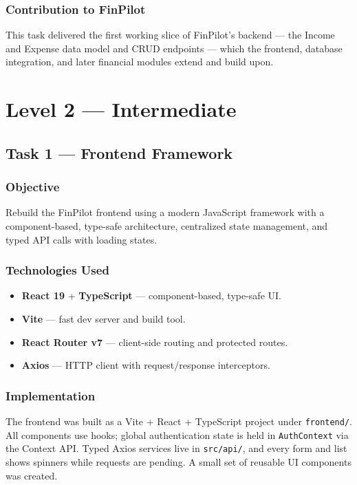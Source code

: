 \documentclass[11pt,a4paper]{report}
\begin{document}
\subsection{Contribution to FinPilot}
This task delivered the first working slice of FinPilot's backend --- the
Income and Expense data model and CRUD endpoints --- which the frontend, database
integration, and later financial modules extend and build upon.

\chapter{Level 2 --- Intermediate}

\section{Task 1 --- Frontend Framework}

\subsection{Objective}
Rebuild the FinPilot frontend using a modern JavaScript framework with a
component-based, type-safe architecture, centralized state management, and typed
API calls with loading states.

\subsection{Technologies Used}
\begin{itemize}[leftmargin=1.4em]
  \item \textbf{React 19} + \textbf{TypeScript} --- component-based, type-safe UI.
  \item \textbf{Vite} --- fast dev server and build tool.
  \item \textbf{React Router v7} --- client-side routing and protected routes.
  \item \textbf{Axios} --- HTTP client with request/response interceptors.
\end{itemize}

\subsection{Implementation}
The frontend was built as a Vite + React + TypeScript project under
\texttt{frontend/}. All components use hooks; global authentication state is held
in \texttt{AuthContext} via the Context API. Typed Axios services live in
\texttt{src/api/}, and every form and list shows spinners while requests are
pending. A small set of reusable UI components was created.
\end{document}
